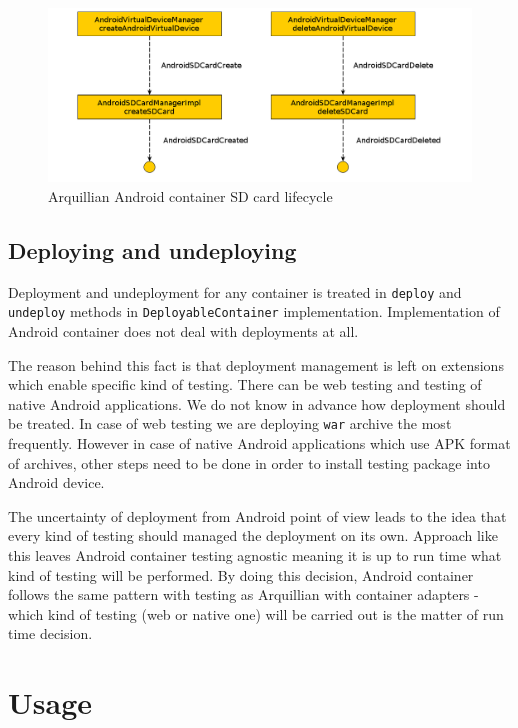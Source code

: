 \documentclass[12pt,final,oneside]{fithesis}
\begin{document}
\begin{figure}[!ht]
	\centering
	\includegraphics[width=120mm]{img/container-sdcards.png}
	\caption{Arquillian Android container SD card lifecycle}
	\label{fig:container_sdcard}
\end{figure}
	
		\subsection{Deploying and undeploying}
	
Deployment and undeployment for any container is treated in \texttt{deploy} and \texttt{undeploy} methods in \texttt{DeployableContainer} implementation. Implementation of Android container does not deal with deployments at all.

The reason behind this fact is that deployment management is left on extensions which enable specific kind of testing. There can be web testing and testing of native Android applications. We do not know in advance how deployment should be treated. In case of web testing we are deploying \texttt{war} archive the most frequently. However in case of native Android applications which use APK format of archives, other steps need to be done in order to install testing package into Android device.

The uncertainty of deployment from Android point of view leads to the idea that every kind of testing should managed the deployment on its own. Approach like this leaves Android container testing agnostic meaning it is up to run time what kind of testing will be performed. By doing this decision, Android container follows the same pattern with testing as Arquillian with container adapters - which kind of testing (web or native one) will be carried out is the matter of run time decision.
	
	\section{Usage}
\end{document}
